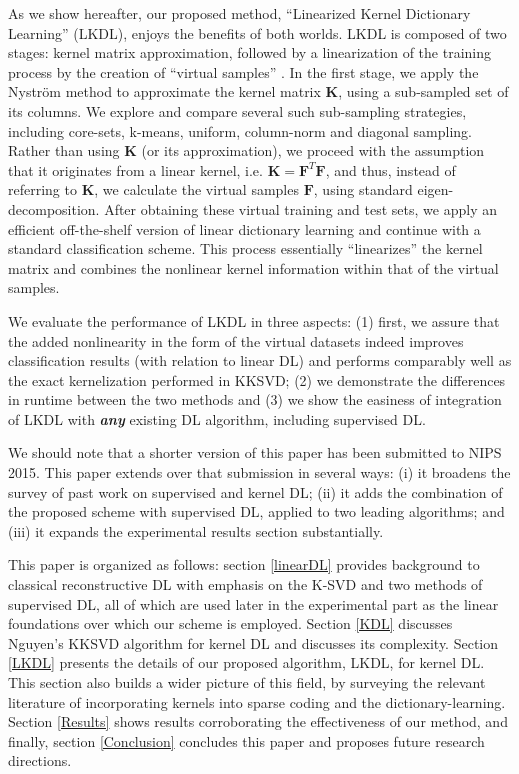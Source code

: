 \documentclass[journal]{IEEEtran}
\newcommand{\bK}{\mathbf{K}}
\newcommand{\bF}{\mathbf{F}}
\begin{document}
As we show hereafter, our proposed method, ``Linearized Kernel Dictionary Learning'' (LKDL), enjoys the benefits of both worlds.
LKDL is composed of two stages: kernel matrix approximation, followed by a linearization of the training process by the creation of ``virtual samples'' \cite{LinearizedKSVM}. In the first stage, we apply the Nystr\"{o}m method to approximate the kernel matrix $\bK$, using a sub-sampled set of its columns. We explore and compare several such sub-sampling strategies, including core-sets, k-means, uniform, column-norm and diagonal sampling. Rather than using $\bK$ (or its approximation), we proceed with the assumption that it originates from a linear kernel, i.e. $\bK=\bF^T\bF$, and thus, instead of referring to $\bK$, we calculate the virtual samples $\bF$, using standard eigen-decomposition. After obtaining these virtual training and test sets, we apply an efficient off-the-shelf version of linear dictionary learning and continue with a standard classification scheme. This process essentially ``linearizes'' the kernel matrix and combines the nonlinear kernel information within that of the virtual samples.

We evaluate the performance of LKDL in three aspects: (1) first, we assure that the added nonlinearity in the form of the virtual datasets indeed improves classification results (with relation to linear DL) and performs comparably well as the exact kernelization performed in KKSVD; (2) we demonstrate the differences in runtime between the two methods and (3) we show the easiness of integration of LKDL with \textit{\textbf{any}} existing DL algorithm, including supervised DL.

We should note that a shorter version of this paper has been submitted to NIPS 2015. This paper extends over that submission in several ways: (i) it broadens the survey  of past work on supervised and kernel DL; (ii) it adds the combination of the proposed scheme with supervised DL, applied to two leading algorithms; and (iii) it expands the experimental results section substantially.

This paper is organized as follows: section \ref{linearDL} provides background to classical reconstructive DL with emphasis on the K-SVD and two methods of supervised DL, all of which are used later in the experimental part as the linear foundations over which our scheme is employed.  Section \ref{KDL} discusses Nguyen's KKSVD algorithm for kernel DL and discusses its complexity. Section \ref{LKDL} presents the details of our proposed algorithm, LKDL, for kernel DL. This section also builds a wider picture of this field, by surveying the relevant literature of incorporating kernels into sparse coding and the dictionary-learning.
Section \ref{Results} shows results corroborating the effectiveness of our method, and finally, section \ref{Conclusion} concludes this paper and proposes future research directions.
\end{document}
